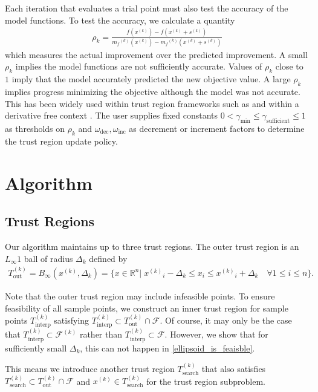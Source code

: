 \documentclass{article}
\theoremstyle{case}
\numberwithin{theorem}{subsection}
\newcommand{\dk}{\Delta_k}
\newcommand{\feasiblek}{{\mathcal F^{(k)}}}
\newcommand{\feasible}{{\mathcal F}}
\newcommand{\gammabi}{\gamma_{\textrm{sufficient}}}
\newcommand{\gammasm}{\gamma_{\textrm{min}}}
\newcommand{\mfk}{{{m}_f}^{(k)}}
\newcommand{\omegadec}{\omega_{\text{dec}}}
\newcommand{\omegainc}{\omega_{\text{inc}}}
\newcommand{\outertrk}{{T_{\text{out}}^{(k)}}}
\newcommand{\rk}{\rho_k}
\newcommand{\Rn}{\mathbb R^n}
\newcommand{\sampletrk}{{T_{\text{interp}}^{(k)}}}
\newcommand{\searchtrk}{{T_{\text{search}}^{(k)}}}
\newcommand{\sk}{{{s}^{(k)}}}
\newcommand{\tr}{{ B_{\infty}\left(\xk, \dk\right) }}
\newcommand{\xk}{{x^{(k)}}}
\begin{document}
Each iteration that evaluates a trial point must also test the accuracy of the model functions.
To test the accuracy, we calculate a quantity
\begin{align}
\label{define_rhok}
\rk = \frac{f(\xk) - f(\xk+\sk)}{\mfk(\xk) - \mfk(\xk+\sk)}
\end{align}
which measures the actual improvement over the predicted improvement.
A small $\rk$ implies the model functions are not sufficiently accurate.
Values of $\rk$ close to $1$ imply that the model accurately predicted the new objective value.
A large $\rk$ implies progress minimizing the objective although the model was not accurate.
This has been widely used within trust region frameworks such as \cite{Conn:2000:TM:357813} and within a derivative free context \cite{DUMMY:intro_book}.
The user supplies fixed constants $0 < \gammasm \le \gammabi \le 1$ as thresholds on $\rk$ and $\omegadec, \omegainc$ as decrement or increment factors to determine the trust region update policy.


\section{Algorithm}

\subsection{Trust Regions}
Our algorithm maintains up to three trust regions.
The outer trust region is an $L_{\infty}1$ ball of radius $ \dk $ defined by
\begin{align}
\outertrk = \tr = \{x\in \Rn | \; {\xk}_i - \dk \le x_i \le {\xk}_i + \dk \quad \forall 1\le i \le n\}. \label{define_outer_trust_region}
\end{align}

Note that the outer trust region may include infeasible points.
To ensure feasibility of all sample points, we construct an inner trust region for sample points $ \sampletrk $  satisfying 
$\sampletrk \subset \outertrk \cap \feasible$.
Of course, it may only be the case that $\sampletrk \subset \feasiblek$ rather than $\sampletrk \subset \feasible$.
However, we show that for sufficiently small $\dk$, this can not happen in \cref{ellipsoid_is_feaisble}.

This means we introduce another trust region $ \searchtrk $ that also satisfies 
$ \searchtrk \subset \outertrk \cap \feasible$ and $\xk \in \searchtrk $ for the trust region subproblem.
\end{document}
